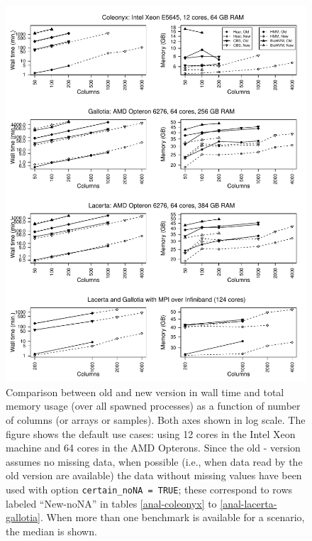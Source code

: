 \documentclass[a4paper,11pt]{article}
\begin{document}
\clearpage
\begin{figure}[h!]
\begin{center}
  \includegraphics[width=16.1cm,keepaspectratio]{anal-benchmark-fig.pdf}
\end{center}
\caption[Wall time and memory usage when analyzing data: version
comparison]{\label{fig-anal} Comparison between old and new version in
  wall time and total memory usage (over all spawned processes) as a
  function of number of columns (or arrays or samples). Both axes shown in
  log scale. The figure shows the default use cases: using 12 cores in the
  Intel Xeon machine and 64 cores in the AMD Opterons. Since the old -
  version assumes no missing data, when possible (i.e., when data read by
  the old version are available) the data without missing values have been
  used with option \texttt{certain\_noNA = TRUE}; these correspond to rows
  labeled ``New-noNA'' in tables \ref{anal-coleonyx} to
  \ref{anal-lacerta-gallotia}. When more than one benchmark is available
  for a scenario, the median is shown.}
\end{figure}
\end{document}
